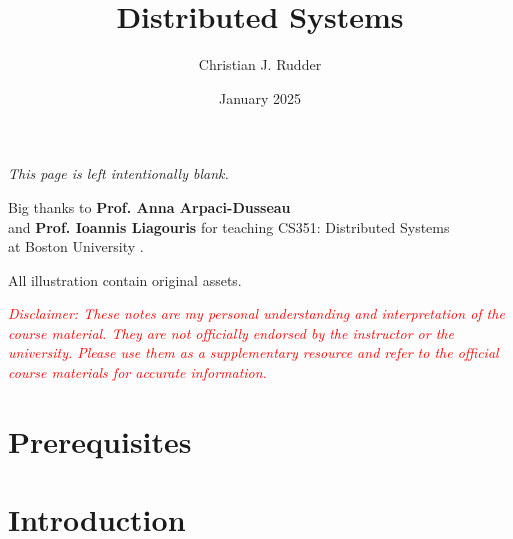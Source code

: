 \documentclass{memoir}
\title{Distributed Systems}
\author{Christian J. Rudder}
\date{January 2025}
\begin{document}
\maketitle
\setcounter{secnumdepth}{2}
\setcounter{tocdepth}{3}

\tableofcontents

\newpage
\thispagestyle{empty}
\mbox{}
\vfill
\begin{center}
    \textit{This page is left intentionally blank.}
\end{center}
\vfill
\newpage
\thispagestyle{empty}
\mbox{}
\vfill
\begin{center}
    \Large{Big thanks to \textbf{Prof. Anna Arpaci-Dusseau}}\\
    and  \textbf{Prof. Ioannis Liagouris}
    \normalsize 
    for teaching CS351: Distributed Systems\\
    at Boston University \cite{liagouris_cs351}.\\
\end{center}

\vfill

\begin{center}
    \noindent All illustration contain original assets.
\end{center}
    \begin{center}
        \textcolor{red}{\textit{Disclaimer: These notes are my personal understanding and interpretation of the course material. 
        They are not officially endorsed by the instructor or the university. Please use them as a supplementary resource and refer 
        to the official course materials for accurate information.}}
    \end{center}

    \chapter*{Prerequisites}
    
    
\chapter{Introduction}
% 
% 
% 
% 
% 
% 
% 

% 
% 
% 
% 
% 
% 


\end{document}
